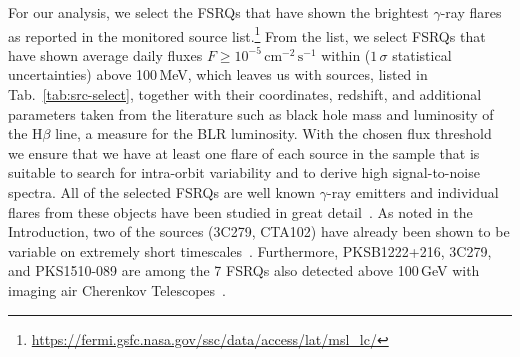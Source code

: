 \documentclass[twocolumn,linenumbers]{aastex62}
\newcommand{\gray}{$\gamma$-ray\xspace}
\begin{document}
For our analysis, we select the FSRQs that have shown the brightest \gray flares as reported in the monitored source list.\footnote{\url{https://fermi.gsfc.nasa.gov/ssc/data/access/lat/msl_lc/}}
From the list, we select FSRQs that have shown average daily fluxes $F \geqslant 10^{-5}\,\mathrm{cm}^{-2}\,\mathrm{s}^{-1}$ within ($1\,\sigma$ statistical uncertainties) above 100\,MeV, which leaves us with sources, listed in Tab.~\ref{tab:src-select}, together with their coordinates, redshift, and additional parameters taken from the literature such as black hole mass and luminosity of the $\mathrm{H}\beta$ line, a measure for the BLR luminosity.  
With the chosen flux threshold we ensure that we have at least one flare of each source in the sample that is suitable to search for intra-orbit variability and to derive high signal-to-noise spectra. 
All of the selected FSRQs are well known \gray emitters and individual flares from these objects have been studied in great detail~\citep[e.g.,][]{2010ApJ...714L..73A,2011ApJ...733...19T,2015ApJ...808L..48P,TheFermi-LAT:2016dss,2013ApJ...766L..11S,2015ApJ...809..164D,2018ApJ...854L..26S,2011ApJ...733L..26A}. 
As noted in the Introduction, two of the sources (3C279, CTA102) have already been shown to be variable on extremely short timescales~\citep{TheFermi-LAT:2016dss,2018ApJ...854L..26S}. 
Furthermore, PKSB1222+216, 3C279, and PKS1510-089  are among the 7 FSRQs also detected above 100\,GeV with imaging air Cherenkov Telescopes~\citep{2011ApJ...730L...8A,2013A&A...554A.107H,2014A&A...569A..46A,2008Sci...320.1752M}. 
\end{document}
